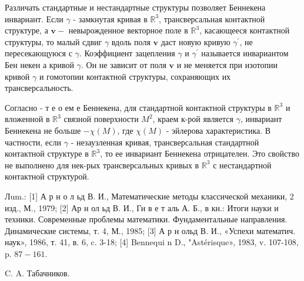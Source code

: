 \documentclass[10pt]{article}
\begin{document}
Различать стандартные и нестандартные структуры позволяет Беннекена инвариант. Если $\gamma$ - замкнутая кривая в $\mathbb{R}^{3}$, трансверсальная контактной структуре, а $\boldsymbol{v}-$ невырожденное векторное поле в $\mathbb{R}^{3}$, касающееся контактной структуры, то малый сдвиг $\gamma$ вдоль поля $\boldsymbol{v}$ даст новую кривую $\gamma^{\prime}$, не пересекающуюся с $\gamma$. Коэффициент зацепления $\gamma$ и $\gamma^{\prime}$ называется инвариантом Бен некен а кривой $\gamma$. Он не зависит от поля $\boldsymbol{v}$ и не меняется при изотопии кривой $\gamma$ и гомотопии контактной структуры, сохраняющих их трансверсальность.



Согласно - т е о ем е Беннекена, для стандартной контактной структуры в $\mathbb{R}^{3}$ и вложенной в $\mathbb{R}^{3}$ связной поверхности $M^{2}$, краем к-рой является $\gamma$, инвариант Беннекена не больше $-\chi(M)$, где $\chi(M)$ - эйлерова характеристика. В частности, если $\gamma$ - незаузленная кривая, трансверсальная стандартной контактной структуре в $\mathbb{R}^{3}$, то ее инвариант Беннекена отрицателен. Это свойство не выполнено для нек-рых трансверсальных кривых в $\mathbb{R}^{3}$ с нестандартной контактной структурой.



Лum.: [1] А р н о л ьд В. И., Математические методы классической механики, 2 изд., М., 1979; [2] Ар н ол ьд В. И., Ги в е т аль А. Б., в кн.: Итоги науки и техники. Современные проблемы математики. Фундаментальные направления. Динамические системы, т. 4, М., 1985; [3] А р н ольд В. И., «Успехи математич. наук», 1986, т. 41, в. 6, c. 3-18; [4] Bennequi n D., "Astérisque», 1983, v. 107-108, p. $87-161$.



C. A. Табачников.
\end{document}
